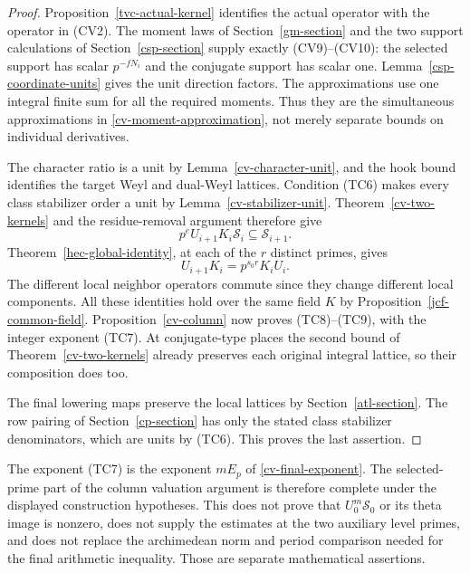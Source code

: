 \begin{proof}
Proposition~\ref{tvc-actual-kernel} identifies the actual operator
with the operator in \textup{(CV2)}. The moment laws of
Section~\ref{gm-section} and the two support calculations of
Section~\ref{csp-section} supply exactly \textup{(CV9)--(CV10)}:
the selected support has scalar $p^{-fN_i}$ and the conjugate
support has scalar one. Lemma~\ref{csp-coordinate-units} gives
the unit direction factors. The approximations use one integral
finite sum for all the required moments. Thus they are the
simultaneous approximations in
\eqref{cv-moment-approximation}, not merely separate bounds on
individual derivatives.

The character ratio is a unit by
Lemma~\ref{cv-character-unit}, and the hook bound identifies the
target Weyl and dual-Weyl lattices. Condition (TC6) makes every
class stabilizer order a unit by
Lemma~\ref{cv-stabilizer-unit}. Theorem~\ref{cv-two-kernels}
and the residue-removal argument therefore give
\[
                      p^eU_{i+1}K_i\mathscr S_i
                                                \subseteq\mathscr S_{i+1}.
\]
Theorem~\ref{hec-global-identity}, at each of the $r$ distinct
primes, gives
\[
                            U_{i+1}K_i=p^{s_0r}K_iU_i.
\]
The different local neighbor operators commute since they change
different local components. All these identities hold over the
same field $K$ by Proposition~\ref{jcf-common-field}.
Proposition~\ref{cv-column} now proves (TC8)--(TC9), with the
integer exponent (TC7). At conjugate-type places the second
bound of Theorem~\ref{cv-two-kernels} already preserves each
original integral lattice, so their composition does too.

The final lowering maps preserve the local lattices by
Section~\ref{atl-section}. The row pairing of
Section~\ref{cp-section} has only the stated class stabilizer
denominators, which are units by (TC6). This proves the last
assertion.
\end{proof}

The exponent (TC7) is the exponent $mE_p$ of
\eqref{cv-final-exponent}. The selected-prime part of the column
valuation argument is therefore complete under the displayed
construction hypotheses. This does not prove that
$U_0^m\mathscr S_0$ or its theta image is nonzero, does not supply
the estimates at the two auxiliary level primes, and does not
replace the archimedean norm and period comparison needed for
the final arithmetic inequality. Those are separate mathematical
assertions.


